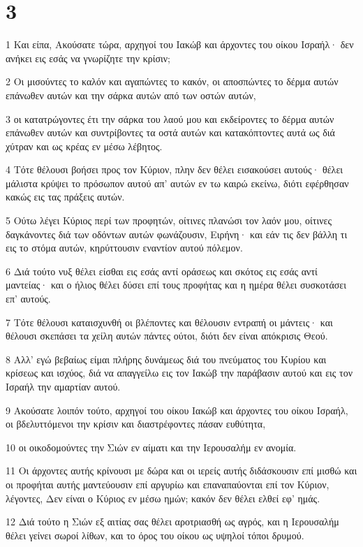 \chapter{3}

\par 1 Και είπα, Ακούσατε τώρα, αρχηγοί του Ιακώβ και άρχοντες του οίκου Ισραήλ· δεν ανήκει εις εσάς να γνωρίζητε την κρίσιν;
\par 2 Οι μισούντες το καλόν και αγαπώντες το κακόν, οι αποσπώντες το δέρμα αυτών επάνωθεν αυτών και την σάρκα αυτών από των οστών αυτών,
\par 3 οι κατατρώγοντες έτι την σάρκα του λαού μου και εκδείροντες το δέρμα αυτών επάνωθεν αυτών και συντρίβοντες τα οστά αυτών και κατακόπτοντες αυτά ως διά χύτραν και ως κρέας εν μέσω λέβητος.
\par 4 Τότε θέλουσι βοήσει προς τον Κύριον, πλην δεν θέλει εισακούσει αυτούς· θέλει μάλιστα κρύψει το πρόσωπον αυτού απ' αυτών εν τω καιρώ εκείνω, διότι εφέρθησαν κακώς εις τας πράξεις αυτών.
\par 5 Ούτω λέγει Κύριος περί των προφητών, οίτινες πλανώσι τον λαόν μου, οίτινες δαγκάνοντες διά των οδόντων αυτών φωνάζουσιν, Ειρήνη· και εάν τις δεν βάλλη τι εις το στόμα αυτών, κηρύττουσιν εναντίον αυτού πόλεμον.
\par 6 Διά τούτο νυξ θέλει είσθαι εις εσάς αντί οράσεως και σκότος εις εσάς αντί μαντείας· και ο ήλιος θέλει δύσει επί τους προφήτας και η ημέρα θέλει συσκοτάσει επ' αυτούς.
\par 7 Τότε θέλουσι καταισχυνθή οι βλέποντες και θέλουσιν εντραπή οι μάντεις· και θέλουσι σκεπάσει τα χείλη αυτών πάντες ούτοι, διότι δεν είναι απόκρισις Θεού.
\par 8 Αλλ' εγώ βεβαίως είμαι πλήρης δυνάμεως διά του πνεύματος του Κυρίου και κρίσεως και ισχύος, διά να απαγγείλω εις τον Ιακώβ την παράβασιν αυτού και εις τον Ισραήλ την αμαρτίαν αυτού.
\par 9 Ακούσατε λοιπόν τούτο, αρχηγοί του οίκου Ιακώβ και άρχοντες του οίκου Ισραήλ, οι βδελυττόμενοι την κρίσιν και διαστρέφοντες πάσαν ευθύτητα,
\par 10 οι οικοδομούντες την Σιών εν αίματι και την Ιερουσαλήμ εν ανομία.
\par 11 Οι άρχοντες αυτής κρίνουσι με δώρα και οι ιερείς αυτής διδάσκουσιν επί μισθώ και οι προφήται αυτής μαντεύουσιν επί αργυρίω και επαναπαύονται επί τον Κύριον, λέγοντες, Δεν είναι ο Κύριος εν μέσω ημών; κακόν δεν θέλει ελθεί εφ' ημάς.
\par 12 Διά τούτο η Σιών εξ αιτίας σας θέλει αροτριασθή ως αγρός, και η Ιερουσαλήμ θέλει γείνει σωροί λίθων, και το όρος του οίκου ως υψηλοί τόποι δρυμού.

